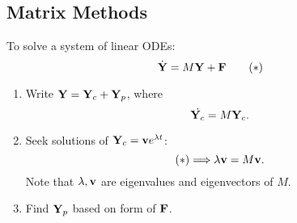 \documentclass[10pt]{article}
\begin{document}
    \subsection{Matrix Methods}
    To solve a system of linear ODEs:
    \[
        \dot{{\bf Y}}=M{\bf Y}+{\bf F}\tag{$*$}
    \]
    \begin{enumerate}
        \item Write $ {\bf Y} = {\bf Y}_c+{\bf Y}_p $, where 
        \[
            \dot{{\bf Y}_c}=M{\bf Y}_c.
        \]
        \item Seek solutions of $ {\bf Y}_c = {\bf v} e^{\lambda t} $:
        \[
            (*) \Longrightarrow \lambda{\bf v} = M{\bf v}.
        \]
        Note that $ \lambda,{\bf v} $ are eigenvalues and eigenvectors of $M$.
        \item Find $ {\bf Y}_p $ based on form of ${\bf F}$. 
    \end{enumerate}
\end{document}
